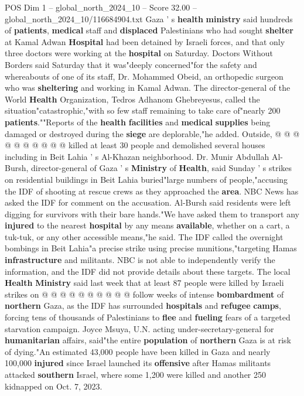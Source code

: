\begin{textsample}{POS Dim 1 – global\_north\_2024\_10 – Score 32.00 – global\_north\_2024\_10/116684904.txt}
Gaza ' s \textbf{health} \textbf{ministry} said hundreds of \textbf{patients}, \textbf{medical} staff and \textbf{displaced} Palestinians who had sought \textbf{shelter} at Kamal Adwan \textbf{Hospital} had been detained by Israeli forces, and that only three doctors were working at the \textbf{hospital} on Saturday.
Doctors Without Borders said Saturday that it was"deeply concerned"for the safety and whereabouts of one of its staff, Dr.
Mohammed Obeid, an orthopedic surgeon who was \textbf{sheltering} and working in Kamal Adwan.
The director-general of the World \textbf{Health} Organization, Tedros Adhanom Ghebreyesus, called the situation"catastrophic,"with so few staff remaining to take care of"nearly 200 \textbf{patients}.""Reports of the \textbf{health} \textbf{facilities} and \textbf{medical} \textbf{supplies} being damaged or destroyed during the \textbf{siege} are deplorable,"he added.
Outside, @ @ @ @ @ @ @ @ @ @ killed at least 30 people and demolished several houses including in Beit Lahia ' s Al-Khazan neighborhood.
Dr.
Munir Abdullah Al-Bursh, director-general of Gaza ' s \textbf{Ministry} of \textbf{Health}, said Sunday ' s strikes on residential buildings in Beit Lahia buried"large numbers of people,"accusing the IDF of shooting at rescue crews as they approached the \textbf{area}.
NBC News has asked the IDF for comment on the accusation.
Al-Bursh said residents were left digging for survivors with their bare hands."We have asked them to transport any \textbf{injured} to the nearest \textbf{hospital} by any means \textbf{available}, whether on a cart, a tuk-tuk, or any other accessible means,"he said.
The IDF called the overnight bombings in Beit Lahia"a precise strike using precise munitions,"targeting Hamas \textbf{infrastructure} and militants.
NBC is not able to independently verify the information, and the IDF did not provide details about these targets.
The local \textbf{Health} \textbf{Ministry} said last week that at least 87 people were killed by Israeli strikes on @ @ @ @ @ @ @ @ @ @ follow weeks of intense \textbf{bombardment} of \textbf{northern} Gaza, as the IDF has surrounded \textbf{hospitals} and \textbf{refugee} \textbf{camps}, forcing tens of thousands of Palestinians to \textbf{flee} and \textbf{fueling} fears of a targeted starvation campaign.
Joyce Msuya, U.N. acting under-secretary-general for \textbf{humanitarian} affairs, said"the entire \textbf{population} of \textbf{northern} Gaza is at risk of dying."An estimated 43,000 people have been killed in Gaza and nearly 100,000 \textbf{injured} since Israel launched its \textbf{offensive} after Hamas militants attacked \textbf{southern} Israel, where some 1,200 were killed and another 250 kidnapped on Oct. 7, 2023.

\end{textsample}
